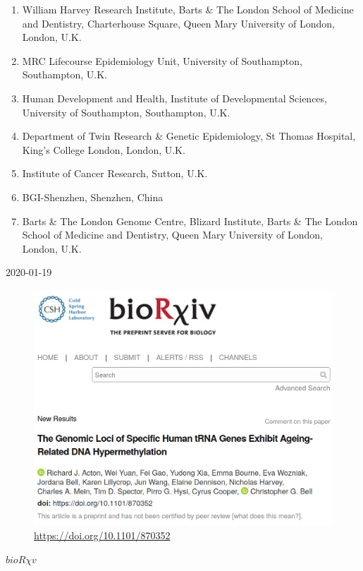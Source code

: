 \documentclass[]{book}
\providecommand{\tightlist}{%
  \setlength{\itemsep}{0pt}\setlength{\parskip}{0pt}}
\begin{document}
\begin{enumerate}
\def\labelenumi{\arabic{enumi}.}
\tightlist
\item
  William Harvey Research Institute, Barts \& The London School of Medicine and Dentistry, Charterhouse Square, Queen Mary University of London, London, U.K.
\item
  MRC Lifecourse Epidemiology Unit, University of Southampton, Southampton, U.K.
\item
  Human Development and Health, Institute of Developmental Sciences, University of Southampton, Southampton, U.K.\\
\item
  Department of Twin Research \& Genetic Epidemiology, St Thomas Hospital, King's College London, London, U.K.
\item
  Institute of Cancer Research, Sutton, U.K.
\item
  BGI-Shenzhen, Shenzhen, China
\item
  Barts \& The London Genome Centre, Blizard Institute, Barts \& The London School of Medicine and Dentistry, Queen Mary University of London, London, U.K.
\end{enumerate}

2020-01-19

\begin{figure}
\centering
\includegraphics{figs/biorxiv_screenshot.png}
\caption{\url{https://doi.org/10.1101/870352}}
\end{figure}

\href{https://doi.org/10.1101/870352}{\(bioR \chi v\)} \citep{Acton2020}
\end{document}
